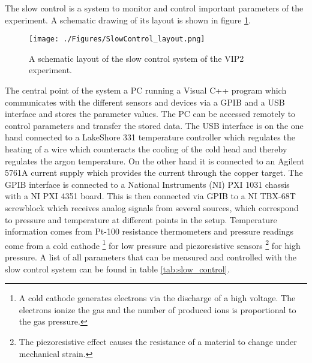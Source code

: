 The slow control is a system to monitor and control important parameters of the experiment. A schematic drawing of its layout is shown in figure \ref{fig:slow_control}. 
\begin{figure}[h]
 \centering
 \texttt{[image: ./Figures/SlowControl\_layout.png]}
 \caption{A schematic layout of the slow control system of the VIP2 experiment.}
 \label{fig:slow_control}
\end{figure}
The central point of the system a PC running a Visual C++ program which communicates with the different sensors and devices via a GPIB and a USB interface and stores the parameter values. The PC can be accessed remotely to control parameters and transfer the stored data. The USB interface is on the one hand connected to a LakeShore 331 temperature controller which regulates the heating of a wire which counteracts the cooling of the cold head and thereby regulates the argon temperature. On the other hand it is connected to an Agilent 5761A current supply which provides the current through the copper target. The GPIB interface is connected to a National Instruments (NI) PXI 1031 chassis with a NI PXI 4351 board. This is then connected via GPIB to a NI TBX-68T screwblock which receives analog signals from several sources, which correspond to pressure and temperature at different points in the setup. Temperature information comes from Pt-100 resistance thermometers and pressure readings come from a cold cathode \footnote{A cold cathode generates electrons via the discharge of a high voltage. The electrons ionize the gas and the number of produced ions is proportional to the gas pressure.} for low pressure and piezoresistive sensors \footnote{The piezoresistive effect causes the resistance of a material to change under mechanical strain.} for high pressure. A list of all parameters that can be measured and controlled with the slow control system can be found in table \ref{tab:slow_control}.

